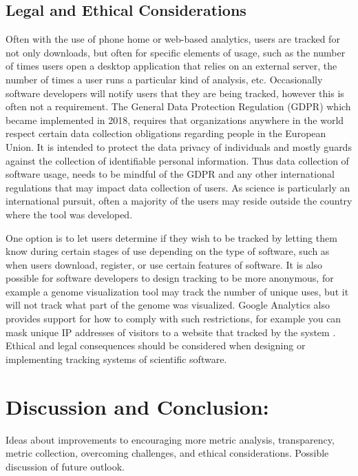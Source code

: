 \documentclass{article}
\begin{document}
\subsection{Legal and Ethical Considerations}\label{sec:legal_ethics}
Often with the use of phone home or web-based analytics, users are tracked for not only downloads, but often for specific elements of usage, such as the number of times users open a desktop application that relies on an external server, the number of times a user runs a particular kind of analysis, etc. Occasionally software developers will notify users that they are being tracked, however this is often not a requirement. The General Data Protection Regulation (GDPR) which became implemented in 2018, requires that organizations anywhere in the world respect certain data collection obligations regarding people in the European Union. It is intended to protect the data privacy of individuals and mostly guards against the collection of identifiable personal information. Thus data collection of software usage, needs to be mindful of the GDPR and any other international regulations that may impact data collection of users.  As science is particularly an international pursuit, often a majority of the users may reside outside the country where the tool was developed.

One option is to let users determine if they wish to be tracked by letting them know during certain stages of use depending on the type of software, such as when users download, register, or use certain features 
 of software. It is also possible for software developers to design tracking to be more anonymous, for example a genome visualization tool may track the number of unique uses, but it will not track what part of the genome was visualized. Google Analytics also provides support for how to comply with such restrictions, for example you can  mask unique IP addresses of visitors to a website that tracked by the system \cite{google_analytics_privacy}.  Ethical and legal consequences should be considered when designing or implementing tracking systems of scientific software. 



\section{Discussion and Conclusion:}
 Ideas about improvements to encouraging more metric analysis, transparency, metric collection, overcoming challenges, and ethical considerations. Possible discussion of future outlook.
\end{document}
